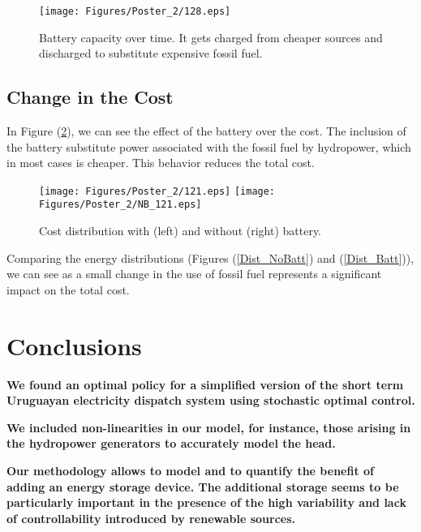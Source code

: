 \documentclass[ima, 20pt, portrait, plainboxedsections]{sciposter}
\begin{document}
\begin{multicols}{3}
\begin{figure}[ht!]
\centering
\texttt{[image: Figures/Poster\_2/128.eps]}
\caption{Battery capacity over time. It gets charged from cheaper sources and discharged to substitute expensive fossil fuel.}
\label{Batt_Cap}
\end{figure}

\subsection*{Change in the Cost}

In Figure (\ref{Cost}), we can see the effect of the battery over the cost. The inclusion of the battery substitute power associated with the fossil fuel by hydropower, which in most cases is cheaper. This behavior reduces the total cost.\\

\begin{figure}[ht!]
\centering
{\texttt{[image: Figures/Poster\_2/121.eps]}}\quad\quad\quad
{\texttt{[image: Figures/Poster\_2/NB\_121.eps]}}
\caption{Cost distribution with (left) and without (right) battery.}
\label{Cost}
\end{figure}
 
Comparing the energy distributions (Figures (\ref{Dist_NoBatt}) and (\ref{Dist_Batt})), we can see as a small change in the use of fossil fuel represents a significant impact on the total cost. 
 
\section*{Conclusions}
  
\begin{itemize}

{\small
\item \textbf{We found an optimal policy for a simplified version of the short term Uruguayan electricity dispatch system using stochastic optimal control.}

\item \textbf{We included non-linearities in our model, for instance, those arising in the hydropower generators to accurately model the head.}

\item \textbf{Our methodology allows to model and to quantify the benefit of adding an energy storage device. The additional storage seems to be particularly important in the presence of the high variability and lack of controllability introduced by renewable sources.}
}


\end{itemize}
\end{multicols}
\end{document}
